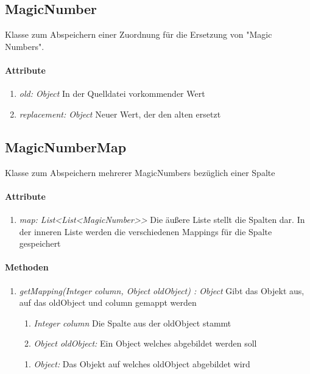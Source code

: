 \subsection{MagicNumber}
Klasse zum Abspeichern einer Zuordnung für die Ersetzung von \string"Magic Numbers\string".

\paragraph{Attribute}
\begin{enumerate}[-]
	\item \textit{old: Object} In der Quelldatei vorkommender Wert
	\item \textit{replacement: Object} Neuer Wert, der den alten ersetzt
\end{enumerate}


\subsection{MagicNumberMap}
Klasse zum Abspeichern mehrerer MagicNumbers bezüglich einer Spalte

\paragraph{Attribute}
\begin{enumerate}[-]
	\item \textit{map: List<List<MagicNumber>{}>} Die äußere Liste stellt die Spalten dar. In der inneren Liste werden die verschiedenen Mappings für die Spalte gespeichert
\end{enumerate}

\paragraph{Methoden}
\begin{enumerate}[+]
	\item \textit{getMapping(Integer column, Object oldObject) : Object} Gibt das Objekt aus, auf das oldObject und column gemappt werden
	
	\begin{enumerate}[$\bullet$]
		\item \textit{Integer column} Die Spalte aus der oldObject stammt
		\item \textit{Object oldObject:} Ein Object welches abgebildet werden soll
	\end{enumerate}
	\vspace{-0.2cm}
	\begin{enumerate}[$\circ$]
		\item \textit{Object:} Das Objekt auf welches oldObject abgebildet wird
	\end{enumerate}
\end{enumerate}
